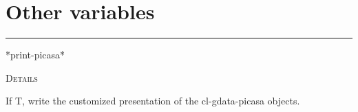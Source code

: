 \documentclass[a4paper]{report}
\begin{document}
  
      \section{Other variables}
      

    \rule{\linewidth}{0.1mm}
    
    \label{cl-gdata-picasa__variable___print-picasa_}
    \begin{defun}[Variable]
    *print-picasa*


	
    \bigskip
    \textsc{Details}

If T, write the customized presentation of the cl-gdata-picasa objects.


    
    \end{defun}
  
  

    \printindex
    
\end{document}
